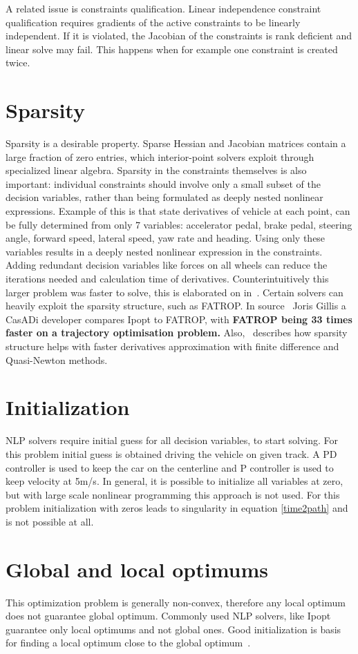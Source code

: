 A related issue is constraints qualification. Linear
independence constraint qualification requires gradients of the active
constraints to be linearly independent. If it is violated, the Jacobian of the constraints is rank deficient and linear solve may fail. This happens when for example one constraint is created twice.

\section{Sparsity}
Sparsity is a desirable property. Sparse Hessian and Jacobian matrices
contain a large fraction of zero entries, which interior-point solvers
exploit through specialized linear algebra. Sparsity in the constraints
themselves is also important: individual constraints should involve only
a small subset of the decision variables, rather than being formulated as
deeply nested nonlinear expressions. Example of this is that state derivatives of vehicle at each point, can be fully determined from only 7 variables:  accelerator pedal, brake pedal, steering angle, forward speed, lateral speed, yaw rate and heading. Using only these variables results in a deeply nested nonlinear expression in the constraints. Adding redundant decision variables like forces on all wheels can reduce the iterations needed and calculation time of derivatives. Counterintuitively this larger problem was faster to solve, this is elaborated on in~\cite{julia_discourse_ipopt_hessian,jump_issue_4024}.
Certain solvers can heavily exploit the sparsity structure, such as FATROP\cite{vanroyeFATROPFastConstrained2023}.
In source~\cite{jorisgillisIpoptSteroidsFatrop2024} Joris Gillis a CasADi
developer compares Ipopt to FATROP, with \textbf{FATROP being 33 times faster
    on a trajectory optimisation problem.}
Also,~\cite{betts} describes how sparsity structure helps with faster derivatives approximation with finite difference and Quasi-Newton methods.

\section{Initialization}
NLP solvers require initial guess for all decision variables, to start solving.
For this problem initial guess is obtained driving the vehicle on given track.
A PD controller is used to keep the car on the centerline and P controller is
used to keep velocity at 5m/s. In general, it is possible to initialize all
variables at zero, but with large scale nonlinear programming this approach is
not used. For this problem initialization with zeros leads to singularity in
equation \ref{time2path} and is not possible at all.

\section{Global and local optimums}
This optimization problem is generally non-convex, therefore any local optimum
does not guarantee global optimum. Commonly used NLP solvers, like Ipopt
guarantee only local optimums and not global ones. Good initialization is basis
for finding a local optimum close to the global optimum~\cite[§5.1, p.~11]{kellyIntroductionTrajectoryOptimization2017}.